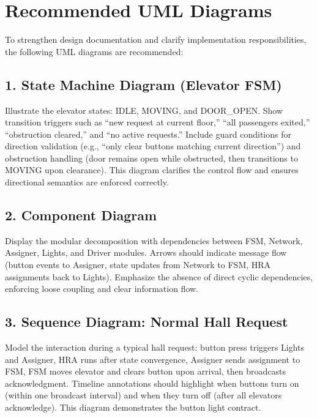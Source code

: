 \documentclass[12pt,a4paper]{article}
\begin{document}
\newpage


\section*{Recommended UML Diagrams}

To strengthen design documentation and clarify implementation responsibilities, the following UML diagrams are recommended:

\subsection*{1. State Machine Diagram (Elevator FSM)}

Illustrate the elevator states: IDLE, MOVING, and DOOR\_OPEN. Show transition triggers such as ``new request at current floor,'' ``all passengers exited,'' ``obstruction cleared,'' and ``no active requests.'' Include guard conditions for direction validation (e.g., ``only clear buttons matching current direction'') and obstruction handling (door remains open while obstructed, then transitions to MOVING upon clearance). This diagram clarifies the control flow and ensures directional semantics are enforced correctly.

\subsection*{2. Component Diagram}

Display the modular decomposition with dependencies between FSM, Network, Assigner, Lights, and Driver modules. Arrows should indicate message flow (button events to Assigner, state updates from Network to FSM, HRA assignments back to Lights). Emphasize the absence of direct cyclic dependencies, enforcing loose coupling and clear information flow.

\subsection*{3. Sequence Diagram: Normal Hall Request}

Model the interaction during a typical hall request: button press triggers Lights and Assigner, HRA runs after state convergence, Assigner sends assignment to FSM, FSM moves elevator and clears button upon arrival, then broadcasts acknowledgment. Timeline annotations should highlight when buttons turn on (within one broadcast interval) and when they turn off (after all elevators acknowledge). This diagram demonstrates the button light contract.
\end{document}
